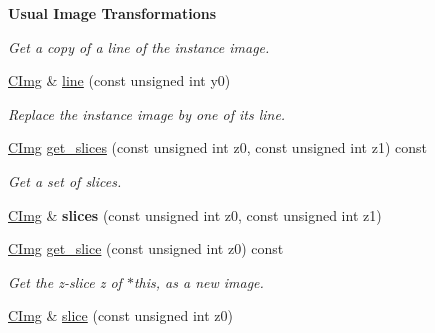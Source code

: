 \begin{Indent}{\bf Usual Image Transformations}
\begin{DoxyCompactItemize}
\begin{DoxyCompactList}\small\item\em Get a copy of a line of the instance image. \item\end{DoxyCompactList}\item 
\hypertarget{structcimg__library_1_1_c_img_a7f3b504730dd9cfcdf1c7b136e97b231}{
\hyperlink{structcimg__library_1_1_c_img}{CImg} \& \hyperlink{structcimg__library_1_1_c_img_a7f3b504730dd9cfcdf1c7b136e97b231}{line} (const unsigned int y0)}
\label{structcimg__library_1_1_c_img_a7f3b504730dd9cfcdf1c7b136e97b231}

\begin{DoxyCompactList}\small\item\em Replace the instance image by one of its line. \item\end{DoxyCompactList}\item 
\hypertarget{structcimg__library_1_1_c_img_a9843f41876a24140412075a8c711bfd3}{
\hyperlink{structcimg__library_1_1_c_img}{CImg} \hyperlink{structcimg__library_1_1_c_img_a9843f41876a24140412075a8c711bfd3}{get\_\-slices} (const unsigned int z0, const unsigned int z1) const }
\label{structcimg__library_1_1_c_img_a9843f41876a24140412075a8c711bfd3}

\begin{DoxyCompactList}\small\item\em Get a set of slices. \item\end{DoxyCompactList}\item 
\hypertarget{structcimg__library_1_1_c_img_af9013da94d902423534f7fe663ec640a}{
\hyperlink{structcimg__library_1_1_c_img}{CImg} \& {\bfseries slices} (const unsigned int z0, const unsigned int z1)}
\label{structcimg__library_1_1_c_img_af9013da94d902423534f7fe663ec640a}

\item 
\hypertarget{structcimg__library_1_1_c_img_a3c47502661949007400a22e30f471cf6}{
\hyperlink{structcimg__library_1_1_c_img}{CImg} \hyperlink{structcimg__library_1_1_c_img_a3c47502661949007400a22e30f471cf6}{get\_\-slice} (const unsigned int z0) const }
\label{structcimg__library_1_1_c_img_a3c47502661949007400a22e30f471cf6}

\begin{DoxyCompactList}\small\item\em Get the z-\/slice {\itshape z\/} of $\ast$this, as a new image. \item\end{DoxyCompactList}\item 
\hypertarget{structcimg__library_1_1_c_img_a312cc5fa661410c0fc1b398a7ad26d91}{
\hyperlink{structcimg__library_1_1_c_img}{CImg} \& \hyperlink{structcimg__library_1_1_c_img_a312cc5fa661410c0fc1b398a7ad26d91}{slice} (const unsigned int z0)}
\label{structcimg__library_1_1_c_img_a312cc5fa661410c0fc1b398a7ad26d91}


\end{DoxyCompactItemize}
\end{Indent}
